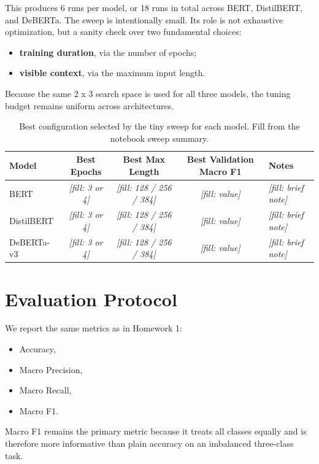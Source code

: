 \documentclass[12pt]{fphw}
\newcommand{\placeholder}[1]{\textit{[fill: #1]}}
\begin{document}
This produces 6 runs per model, or 18 runs in total across BERT, DistilBERT, and DeBERTa. The sweep is intentionally small. Its role is not exhaustive optimization, but a sanity check over two fundamental choices:
\begin{itemize}
	\item \textbf{training duration}, via the number of epochs;
	\item \textbf{visible context}, via the maximum input length.
\end{itemize}

Because the same 2 x 3 search space is used for all three models, the tuning budget remains uniform across architectures.

\begin{table}[h]
\centering
\small
\begin{tabularx}{\textwidth}{XcccX}
\toprule
Model & Best Epochs & Best Max Length & Best Validation Macro F1 & Notes \\
\midrule
BERT & \placeholder{3 or 4} & \placeholder{128 / 256 / 384} & \placeholder{value} & \placeholder{brief note} \\
DistilBERT & \placeholder{3 or 4} & \placeholder{128 / 256 / 384} & \placeholder{value} & \placeholder{brief note} \\
DeBERTa-v3 & \placeholder{3 or 4} & \placeholder{128 / 256 / 384} & \placeholder{value} & \placeholder{brief note} \\
\bottomrule
\end{tabularx}
\caption{Best configuration selected by the tiny sweep for each model. Fill from the notebook sweep summary.}
\label{tab:sweep-results}
\end{table}

\section{Evaluation Protocol}

We report the same metrics as in Homework 1:
\begin{itemize}
	\item Accuracy,
	\item Macro Precision,
	\item Macro Recall,
	\item Macro F1.
\end{itemize}

Macro F1 remains the primary metric because it treats all classes equally and is therefore more informative than plain accuracy on an imbalanced three-class task.
\end{document}
